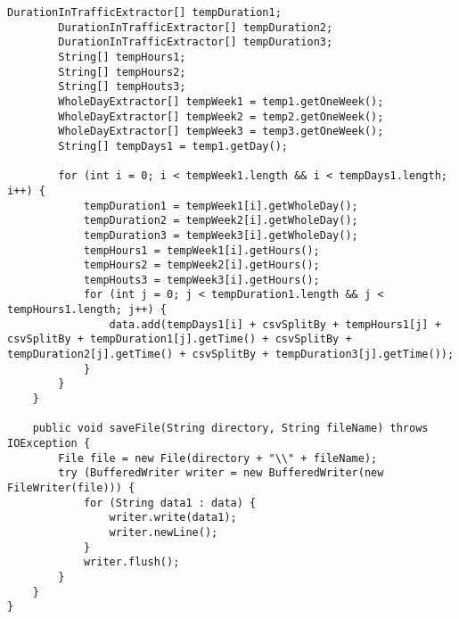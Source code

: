 \begin{lstlisting}[caption= DataProcessor.java]
        DurationInTrafficExtractor[] tempDuration1;
        DurationInTrafficExtractor[] tempDuration2;
        DurationInTrafficExtractor[] tempDuration3;
        String[] tempHours1;
        String[] tempHours2;
        String[] tempHouts3;
        WholeDayExtractor[] tempWeek1 = temp1.getOneWeek();
        WholeDayExtractor[] tempWeek2 = temp2.getOneWeek();
        WholeDayExtractor[] tempWeek3 = temp3.getOneWeek();
        String[] tempDays1 = temp1.getDay();

        for (int i = 0; i < tempWeek1.length && i < tempDays1.length; i++) {
            tempDuration1 = tempWeek1[i].getWholeDay();
            tempDuration2 = tempWeek2[i].getWholeDay();
            tempDuration3 = tempWeek3[i].getWholeDay();
            tempHours1 = tempWeek1[i].getHours();
            tempHours2 = tempWeek2[i].getHours();
            tempHouts3 = tempWeek3[i].getHours();
            for (int j = 0; j < tempDuration1.length && j < tempHours1.length; j++) {
                data.add(tempDays1[i] + csvSplitBy + tempHours1[j] + csvSplitBy + tempDuration1[j].getTime() + csvSplitBy + tempDuration2[j].getTime() + csvSplitBy + tempDuration3[j].getTime());
            }
        }
    }

    public void saveFile(String directory, String fileName) throws IOException {
        File file = new File(directory + "\\" + fileName);
        try (BufferedWriter writer = new BufferedWriter(new FileWriter(file))) {
            for (String data1 : data) {
                writer.write(data1);
                writer.newLine();
            }
            writer.flush();
        }
    }
}
\end{lstlisting}